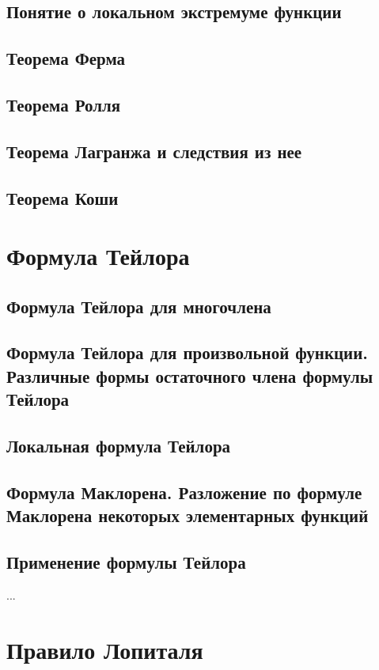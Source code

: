 \subsection{Понятие о локальном экстремуме функции}

\subsection{Теорема Ферма}

\subsection{Теорема Ролля}

\subsection{Теорема Лагранжа и следствия из нее}

\subsection{Теорема Коши}


\section{Формула Тейлора}
\subsection{Формула Тейлора для многочлена}
\subsection{Формула Тейлора для произвольной функции. Различные формы остаточного члена формулы Тейлора}
\subsection{Локальная формула Тейлора}
\subsection{Формула Маклорена. Разложение по формуле Маклорена некоторых элементарных функций}
\subsection{Применение формулы Тейлора}
...

\section{Правило Лопиталя}
